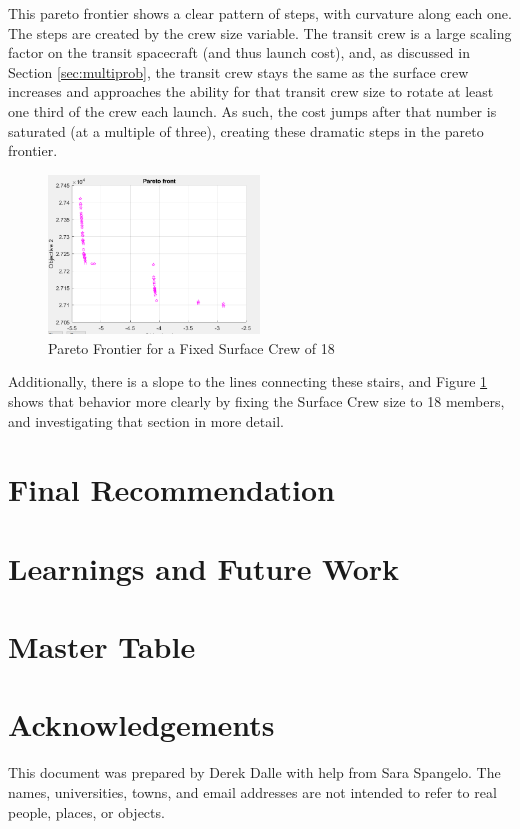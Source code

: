 \documentclass[]{aiaa-pretty}
\begin{document}
This pareto frontier shows a clear pattern of steps, with curvature along each one.  The steps are created by the crew size variable. The transit crew is a large scaling factor on the transit spacecraft (and thus launch cost), and, as discussed in Section \ref{sec:multiprob}, the transit crew stays the same as the surface crew increases and approaches the ability for that transit crew size to rotate at least one third of the crew each launch.  As such, the cost jumps after that number is saturated (at a multiple of three), creating these dramatic steps in the pareto frontier.

\begin{figure}[htb!]
	\centering
	\includegraphics[width=0.5\textwidth]{pareto18}
	\caption{Pareto Frontier for a Fixed Surface Crew of 18}
	\label{fig:pareto18}
\end{figure}

Additionally, there is a slope to the lines connecting these stairs, and Figure \ref{fig:pareto18} shows that behavior more clearly by fixing the Surface Crew size to 18 members, and investigating that section in more detail.

\section{Final Recommendation}


\section{Learnings and Future Work} 



\appendix
\section{Master Table}
\label{app:mastertab}


\section*{Acknowledgements}
This document was prepared by Derek Dalle with help from Sara Spangelo.  The names, universities, towns, and email addresses are not intended to refer to real people, places, or objects.



\end{document}
